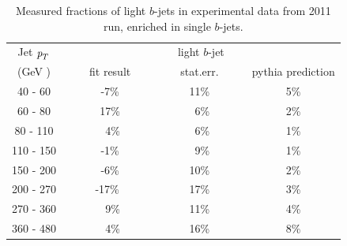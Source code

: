 \begin{table}[!hbt] %
\renewcommand{\arraystretch}{1.2}
\centering
\begin{tabular}{ | c || c | c | c ||}
  \hline
  Jet ${\emph{p}_{T}}$ & \multicolumn{3}{c||}{light $b$-jet}\\ \cline{2-4}
    (GeV ) & ~~~~fit result~~~ & ~~~~stat.err.~~~~ & pythia prediction \\ \hline
   40 - 60 &  ~-7\%  &  11\%  &  5\% \\  
   60 - 80 &  ~17\%  &  ~6\%  &  2\% \\ 
   80 - 110&  ~~4\%  &  ~6\%  &  1\% \\ 
  110 - 150&  ~-1\%  &  ~9\%  &  1\% \\ 
  150 - 200&  ~-6\%  &  10\%  &  2\% \\ 
  200 - 270&  -17\%  &  17\%  &  3\% \\ 
  270 - 360&  ~~9\%  &  11\%  &  4\% \\ 
  360 - 480&  ~~4\%  &  16\%  &  8\% \\ \hline
\end{tabular}
\caption{Measured fractions of light $b$-jets in experimental data from 2011 run, enriched in single $b$-jets.}
\label{tb:fitfractions2btagL}
\end{table}
